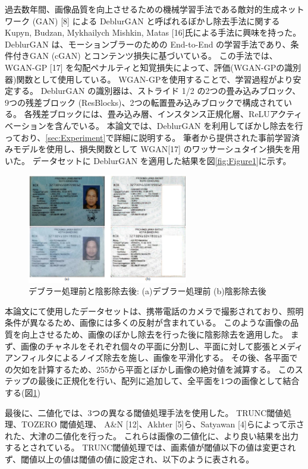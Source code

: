 \documentclass[uplatex, twocolumn,10pt]{jsarticle}
\begin{document}
過去数年間、画像品質を向上させるための機械学習手法である敵対的生成ネットワーク (GAN) [8] による DeblurGAN と呼ばれるぼかし除去手法に関する Kupyn, Budzan, Mykhailych Mishkin, Matas [16]氏による手法に興味を持った。
DeblurGAN は、モーションブラーのための End-to-End の学習手法であり、条件付きGAN (cGAN) とコンテンツ損失に基づいている。
この手法では、WGAN-GP [17] を勾配ペナルティと知覚損失によって、評価(WGAN-GPの識別器)関数として使用している。
WGAN-GPを使用することで、学習過程がより安定する。
DeblurGAN の識別器は、ストライド 1/2 の2つの畳み込みブロック、9つの残差ブロック (ResBlocks)、2つの転置畳み込みブロックで構成されている。
各残差ブロックには、畳み込み層、インスタンス正規化層、ReLUアクティベーションを含んでいる。
本論文では、DeblurGAN を利用してぼかし除去を行っており、\ref{sec:Experiment}で詳細に説明する。
筆者から提供された事前学習済みモデルを使用し、損失関数として WGAN[17] のワッサーシュタイン損失を用いた。
データセットに DeblurGAN を適用した結果を図\ref{fig:Figure1}に示す。

\begin{figure}[t]
    \begin{center}
        \includegraphics*[width=7cm]{image/Figure2.png}
        \caption{デブラー処理前と陰影除去後: (a)デブラー処理前 (b)陰影除去後}
        \label{fig:Figure2}
    \end{center}
\end{figure}

本論文にて使用したデータセットは、携帯電話のカメラで撮影されており、照明条件が異なるため、画像には多くの反射が含まれている。
このような画像の品質を向上させるため、画像のぼかし除去を行った後に陰影除去を適用した。
まず、画像のチャネルをそれぞれ個々の平面に分割し、平面に対して膨張とメディアンフィルタによるノイズ除去を施し、画像を平滑化する。
その後、各平面での欠如を計算するため、255から平面とぼかし画像の絶対値を減算する。
このステップの最後に正規化を行い、配列に追加して、全平面を1つの画像として結合する(図\ref{fig:Figure2})

最後に、二値化では、3つの異なる閾値処理手法を使用した。
TRUNC閾値処理、TOZERO 閾値処理、 A\&N [12]、Akhter [5]ら、Satyawan [4]らによって示された、大津の二値化を行った。
これらは画像の二値化に、より良い結果を出力するとされている。
TRUNC閾値処理では、画素値が閾値以下の値は変更されず、閾値以上の値は閾値の値に設定され、以下のように表される。
\end{document}
